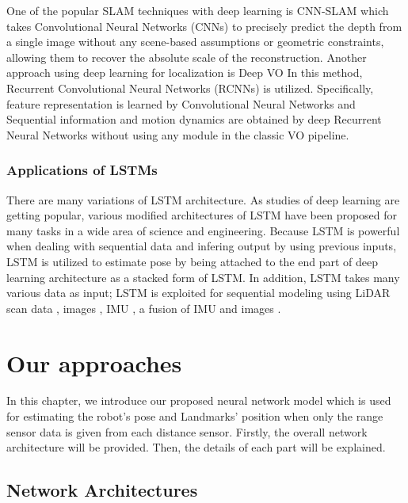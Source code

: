 \documentclass[letterpaper, 10 pt, conference]{ieeeconf}  %
\begin{document}
One of the popular SLAM techniques with deep learning is CNN-SLAM \cite{tateno2017cnn} which takes Convolutional Neural Networks (CNNs) to precisely predict the depth from a single image without any scene-based assumptions or geometric constraints, allowing them to recover the absolute scale of the reconstruction. Another approach using deep learning for localization is Deep VO \cite{clark2017vinet} In this method, Recurrent Convolutional Neural Networks (RCNNs) is utilized. Specifically, feature representation is learned by Convolutional Neural Networks and Sequential information and motion dynamics are obtained by deep Recurrent Neural Networks without using any module in the classic VO pipeline.



\subsubsection{Applications of LSTMs}

There are many variations of LSTM architecture. As studies of deep learning are getting popular, various modified architectures of LSTM have been proposed for many tasks in a wide area of science and engineering. Because LSTM is powerful when dealing with sequential data and infering output by using previous inputs, LSTM is utilized to estimate pose by being attached to the end part of deep learning architecture \cite{wang2017deepvo, kendall2015posenet, turan2018deep}  as a stacked form of LSTM. In addition, LSTM takes many various data as input; LSTM is exploited for sequential modeling using LiDAR scan data \cite{gladh2016deep}, images \cite{walch2017image, wang2017deepvo}, IMU \cite{ordonez2016deep}, a fusion of IMU and images \cite{clark2017vinet}.


\section{Our approaches}

In this chapter, we introduce our proposed neural network model which is used for estimating the robot’s pose and Landmarks’ position when only the range sensor data is given from each distance sensor. Firstly, the overall network architecture will be provided. Then, the details of each part will be explained.   

\subsection{Network Architectures}
\end{document}
